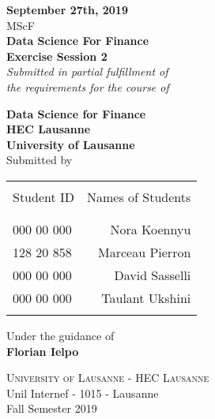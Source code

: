 \begin{titlepage}

\begin{center}

\textup{\small {\bf September 27th, 2019} \\ MScF}\\[0.2in]

\Large \textbf {Data Science For Finance \\ Exercise Session 2}\\[0.5in]

       \small \emph{Submitted in partial fulfillment of\\
        the requirements for the course of}
        \vspace{.2in}

       {\bf Data Science for Finance \\ HEC Lausanne \\ University of Lausanne}\\[0.5in]

\normalsize Submitted by \\
\begin{table}[h]
\centering
\begin{tabular}{lr}\hline \\
Student ID & Names of Students \\ \\ \hline
\\
000 00 000 & Nora Koennyu \\
128 20 858 & Marceau Pierron \\
000 00 000 & David Sasselli \\ 
000 00 000 & Taulant Ukshini \\ \\ \hline 
\end{tabular}
\end{table}

\vspace{.1in}
Under the guidance of\\
{\textbf{Florian Ielpo}}\\[0.2in]

\vfill

\normalsize
\textsc{University of Lausanne - HEC Lausanne}\\
Unil Internef - 1015 - Lausanne \\
\vspace{0.2cm}
Fall Semester 2019

\end{center}

\end{titlepage}
